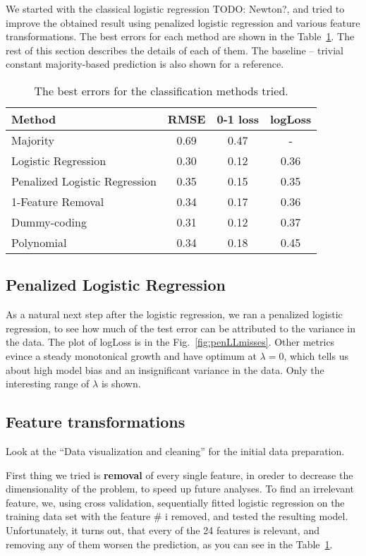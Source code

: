 \documentclass{article} %
\newcommand{\todo}[1]{}
\renewcommand{\todo}[1]{{\color{red} TODO: {#1}}}
\begin{document}
We started with the classical logistic regression \todo{Newton?}, and tried to improve the obtained result using penalized logistic regression and various feature transformations. The best errors for each method are shown in the Table~\ref{tab:classification-errors}. The rest of this section describes the details of each of them. The baseline -- trivial constant majority-based prediction is also shown for a reference.
\begin{table}[h]
  \begin{center}
    \begin{tabular}{l|ccc}
      Method & RMSE & 0-1 loss & logLoss \\
      \hline
      Majority & 0.69 & 0.47 & - \\
      Logistic Regression & 0.30 & 0.12 & 0.36 \\
      Penalized Logistic Regression & 0.35 & 0.15 & 0.35  \\
      1-Feature Removal & 0.34 & 0.17 & 0.36 \\
      Dummy-coding & 0.31 & 0.12 & 0.37 \\
      Polynomial & 0.34 & 0.18 & 0.45
    \end{tabular}
    \caption{The best errors for the classification methods tried.}
    \label{tab:classification-errors}
  \end{center}
\end{table}

\subsection{Penalized Logistic Regression}
As a natural next step after the logistic regression, we ran a penalized logistic regression, to see how much of the test error can be attributed to the variance in the data. The plot of logLoss is in the Fig.~\ref{fig:penLLmisses}. Other metrics evince a steady monotonical growth and have optimum at $\lambda = 0$, which tells us about high model bias and an insignificant variance in the data. Only the interesting range of $\lambda$ is shown.

\subsection{Feature transformations}
Look at the ``Data visualization and cleaning'' for the initial data preparation.

First thing we tried is {\bf removal} of every single feature, in oreder to decrease the dimensionality of the problem, to speed up future analyses. To find an irrelevant feature, we, using cross validation, sequentially fitted logistic regression on the training data set with the feature \# i removed, and tested the resulting model. Unfortunately, it turns out, that every of the 24 features is relevant, and removing any of them worsen the prediction, as you can see in the Table~\ref{tab:classification-errors}.
\end{document}
